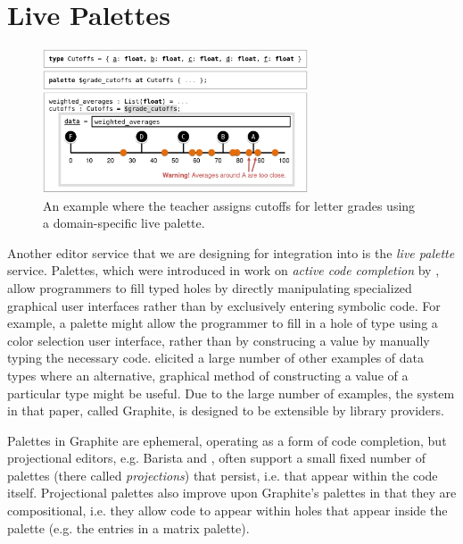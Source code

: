 
\section{Live Palettes}
\label{sec:palettes}


\begin{figure}[t]
\vspace{-4px}
\includegraphics[width=0.7\textwidth]{images/cutoffs-new-elided.png}
\caption{An example where the teacher assigns cutoffs 
for letter grades using a domain-specific live palette.}
\label{fig:cutoffs-example}
\vspace{-4px}
\end{figure}

Another editor service that we are designing for integration into \Hazel 
is the \emph{live palette} service.
Palettes, which were introduced in work on
\emph{active code completion} by \citet{ActiveCodeCompletion},  allow programmers to fill typed 
holes by directly manipulating specialized graphical user interfaces rather than by exclusively entering symbolic
code. For example, a palette might allow the programmer to 
fill in a hole of type  using a color selection  
user interface, rather than by construcing a  value  
by manually typing the necessary code. \citet{ActiveCodeCompletion} elicited a large number of other
examples of data types where an alternative, graphical 
method of constructing a value of a particular type might be
useful. Due to the large number of examples, the system in that paper, called {Graphite}, is designed to be extensible by library providers. 

Palettes in {Graphite} 
are ephemeral, operating as a form of code completion, but projectional editors, e.g. Barista \cite{ko_barista:_2006} and  \cite{voelter_mbeddr:_2012}, often support a small fixed number of  
palettes (there called \emph{projections}) that persist, i.e. that appear within the code itself. 
Projectional palettes also improve upon Graphite's palettes in that they are compositional, i.e. they allow code to appear within holes that appear inside the palette (e.g. the entries in a matrix palette). 

